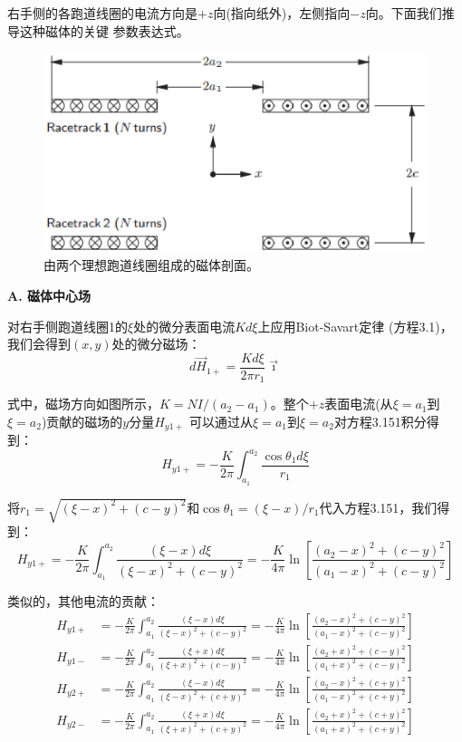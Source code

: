 右手侧的各跑道线圈的电流方向是$+z$向(指向纸外)，左侧指向$-z$向。下面我们推导这种磁体的关键
参数表达式。
\begin{figure}[htbp]
	\centering
	\includegraphics[scale=0.5]{chpt3/figs/fig3.36.eps}
	\caption{由两个理想跑道线圈组成的磁体剖面。}
\end{figure}

\textbf{A. 磁体中心场}

对右手侧跑道线圈1的$\xi$处的微分表面电流$Kd\xi$上应用Biot-Savart定律 (方程3.1)，
我们会得到$(x,y)$处的微分磁场：
\begin{equation}
d\vec{H}_{1+}=\frac{K d\xi}{2\pi r_{1}}\vec{\imath}%
\end{equation}

式中，磁场方向如图所示，$K=NI/(a_2-a_1)$。整个$+z$表面电流(从$\xi=a_1$到$\xi=a_2$)贡献的磁场的$y$分量$H_{y1+}$
可以通过从$\xi=a_1$到$\xi=a_2$对方程3.151积分得到：
\begin{equation}
H_{y1+}=-\frac{K}{2\pi}\int_{a_{1}}^{a_{2}}\frac{\cos\theta_{1}d\xi}{r_{1}}%
\end{equation}

将$r_1=\sqrt{(\xi−x)^2+(c−y)^2}$和$\cos\theta_1=(\xi−x)/r_1$代入方程3.151，我们得到：
\begin{equation}
H_{y1+}=-\frac{K}{2\pi}\int_{a_{1}}^{a_{2}}\frac{(\xi-x)d\xi}{(\xi-x)^2+(c-y)^2}=
-\frac{K}{4\pi}\ln\left[\frac{(a_2-x)^2+(c-y)^2}{(a_1-x)^2+(c-y)^2}\right]%
\end{equation}

类似的，其他电流的贡献：
\begin{eqnarray*}
H_{y1+}&=-\frac{K}{2\pi}\int_{a_{1}}^{a_{2}}\frac{(\xi-x)d\xi}{(\xi-x)^{2}+(c-y)^{2}}=-\frac{K}{4\pi}\ln\left[\frac{(a_{2}-x)^{2}+(c-y)^{2}}{(a_{1}-x)^{2}+(c-y)^{2}}\right]\\%
H_{y1-}&=-\frac{K}{2\pi}\int_{a_{1}}^{a_{2}}\frac{(\xi+x)d\xi}{(\xi+x)^{2}+(c-y)^{2}}=-\frac{K}{4\pi}\ln\left[\frac{(a_{2}+x)^{2}+(c-y)^{2}}{(a_{1}+x)^{2}+(c-y)^{2}}\right]\\%
H_{y2+}&=-\frac{K}{2\pi}\int_{a_{1}}^{a_{2}}\frac{(\xi-x)d\xi}{(\xi-x)^{2}+(c+y)^{2}}=-\frac{K}{4\pi}\ln\left[\frac{(a_{2}-x)^{2}+(c+y)^{2}}{(a_{1}-x)^{2}+(c+y)^{2}}\right]\\%
H_{y2-}&=-\frac{K}{2\pi}\int_{a_{1}}^{a_{2}}\frac{(\xi+x)d\xi}{(\xi+x)^{2}+(c+y)^{2}}=-\frac{K}{4\pi}\ln\left[\frac{(a_{2}+x)^{2}+(c+y)^{2}}{(a_{1}+x)^{2}+(c+y)^{2}}\right]%
\end{eqnarray*}

